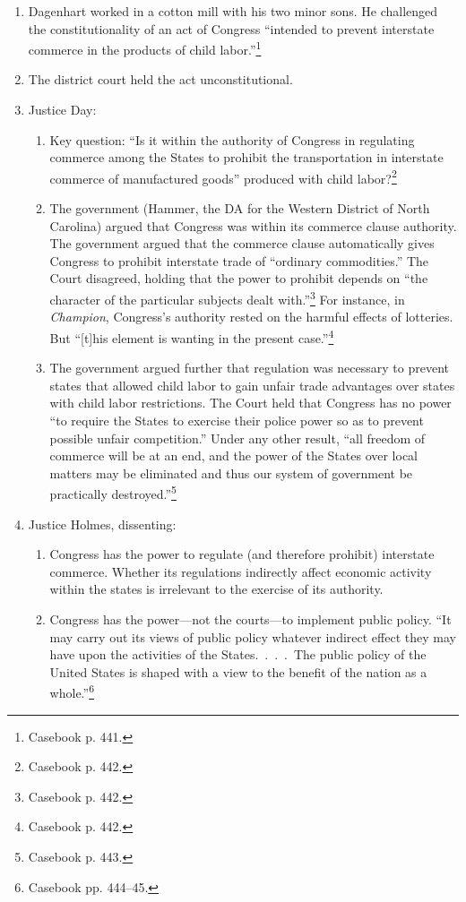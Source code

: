 \begin{enumerate}
    \item Dagenhart worked in a cotton mill with his two minor sons. He 
    challenged the constitutionality of an act of Congress ``intended to 
    prevent interstate commerce in the products of child 
    labor.''\footnote{Casebook p. 441.}
    \item The district court held the act unconstitutional.
    \item Justice Day:
    \begin{enumerate}
        \item Key question: ``Is it within the authority of Congress in 
        regulating commerce among the States to prohibit the transportation in 
        interstate commerce of manufactured goods'' produced with child 
        labor?\footnote{Casebook p. 442.}
        \item The government (Hammer, the DA for the Western District of North 
        Carolina) argued that Congress was within its commerce clause 
        authority. The government argued that the commerce clause automatically 
        gives Congress to prohibit interstate trade of ``ordinary 
        commodities.'' The Court disagreed, holding that the power to prohibit 
        depends on ``the character of the particular subjects dealt 
        with.''\footnote{Casebook p. 442.} For instance, in \emph{Champion}, 
        Congress's authority rested on the harmful effects of lotteries. But 
        ``[t]his element is wanting in the present case.''\footnote{Casebook 
        p. 442.}
        \item The government argued further that regulation was necessary to 
        prevent states that allowed child labor to gain unfair trade 
        advantages over states with child labor restrictions. The Court held 
        that Congress has no power ``to require the States to exercise their 
        police power so as to prevent possible unfair competition.'' Under any 
        other result, ``all freedom of commerce will be at an end, and the 
        power of the States over local matters may be eliminated and thus our 
        system of government be practically destroyed.''\footnote{Casebook p. 
        443.}
    \end{enumerate}
    \item Justice Holmes, dissenting:
    \begin{enumerate}
        \item Congress has the power to regulate (and therefore prohibit) 
        interstate commerce. Whether its regulations indirectly affect 
        economic activity within the states is irrelevant to the exercise of 
        its authority.
        \item Congress has the power---not the courts---to implement public 
        policy. ``It may carry out its views of public policy whatever 
        indirect effect they may have upon the activities of the 
        States.~.~.~.~The public policy of the United States is shaped with a 
        view to the benefit of the nation as a whole.''\footnote{Casebook pp. 
        444--45.}
    \end{enumerate}
\end{enumerate}

